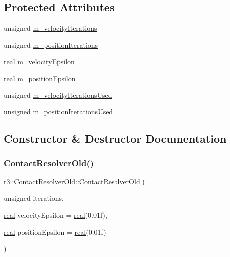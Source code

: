 \subsection*{Protected Attributes}
\begin{DoxyCompactItemize}
\item 
unsigned \mbox{\hyperlink{classr3_1_1_contact_resolver_old_ac2829b208a21c2cb3902cee603e07bdd}{m\+\_\+velocity\+Iterations}}
\item 
unsigned \mbox{\hyperlink{classr3_1_1_contact_resolver_old_a3ed5ff0480a616abaf4b2419cd17d914}{m\+\_\+position\+Iterations}}
\item 
\mbox{\hyperlink{namespacer3_ab2016b3e3f743fb735afce242f0dc1eb}{real}} \mbox{\hyperlink{classr3_1_1_contact_resolver_old_a13d89abda1eafba06fce820a9216c028}{m\+\_\+velocity\+Epsilon}}
\item 
\mbox{\hyperlink{namespacer3_ab2016b3e3f743fb735afce242f0dc1eb}{real}} \mbox{\hyperlink{classr3_1_1_contact_resolver_old_a3c78dc280aa7b4c225efe5ad0c463dba}{m\+\_\+position\+Epsilon}}
\item 
unsigned \mbox{\hyperlink{classr3_1_1_contact_resolver_old_ac93418569aaadc1fed711b9d7902ac56}{m\+\_\+velocity\+Iterations\+Used}}
\item 
unsigned \mbox{\hyperlink{classr3_1_1_contact_resolver_old_a88dc91918290c9d56f3556c3ecf3f83f}{m\+\_\+position\+Iterations\+Used}}
\end{DoxyCompactItemize}


\subsection{Constructor \& Destructor Documentation}
\mbox{\label{classr3_1_1_contact_resolver_old_a9b2d9927dcfba2d902d6c8e8f725dfcf}} 
\subsubsection{\texorpdfstring{Contact\+Resolver\+Old()}{ContactResolverOld()}\hspace{0.1cm}{\footnotesize\ttfamily [1/2]}}
{\footnotesize\ttfamily r3\+::\+Contact\+Resolver\+Old\+::\+Contact\+Resolver\+Old (\begin{DoxyParamCaption}\item[{unsigned}]{iterations,  }\item[{\mbox{\hyperlink{namespacer3_ab2016b3e3f743fb735afce242f0dc1eb}{real}}}]{velocity\+Epsilon = {\ttfamily \mbox{\hyperlink{namespacer3_ab2016b3e3f743fb735afce242f0dc1eb}{real}}(0.01f)},  }\item[{\mbox{\hyperlink{namespacer3_ab2016b3e3f743fb735afce242f0dc1eb}{real}}}]{position\+Epsilon = {\ttfamily \mbox{\hyperlink{namespacer3_ab2016b3e3f743fb735afce242f0dc1eb}{real}}(0.01f)} }\end{DoxyParamCaption})\hspace{0.3cm}{\ttfamily [explicit]}}

